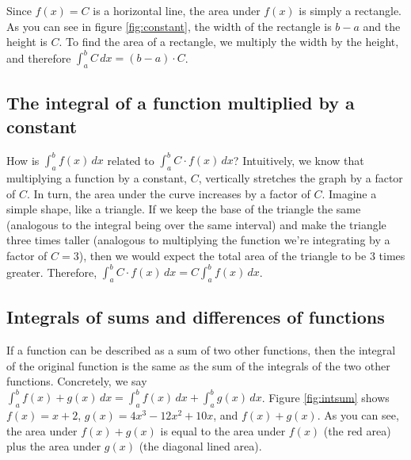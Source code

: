 Since $f(x) = C$ is a horizontal line, the area under $f(x)$ is simply 
a rectangle. As you can see in figure \ref{fig:constant}, the width of 
the rectangle is $b - a$ and the height is $C$. To find the area of a 
rectangle, we multiply the width by the height, and therefore $\int_a^b 
C\,dx = (b - a)\cdot C$.

\subsection{The integral of a function multiplied by a constant}
How is $\int_a^b f(x)\,dx$ related to $\int_a^b C \cdot f(x)\,dx$? 
Intuitively, we know that multiplying a function by a constant, $C$, 
vertically stretches the graph by a factor of $C$. In turn, the area 
under the curve increases by a factor of $C$. Imagine a simple shape, 
like a triangle. If we keep the base of the triangle the same 
(analogous to the integral being over the same interval) and make the 
triangle three times taller (analogous to multiplying the function 
we're integrating by a factor of $C = 3$), then we would expect the 
total area of the triangle to be 3 times greater. Therefore, 
$\int_a^b C \cdot f(x)\,dx = C \int_a^b f(x)\,dx$. 

\subsection{Integrals of sums and differences of functions}
If a function can be described as a sum of two other functions, then 
the integral of the original function is the same as the sum of the 
integrals of the two other functions. Concretely, we say $\int_a^b 
f(x) + g(x)\,dx = \int_a^b f(x)\,dx + \int_a^b g(x)\,dx$. Figure 
\ref{fig:intsum} shows $f(x) = x + 2$, $g(x) = 4x^3-12x^2+10x$, and 
$f(x) + g(x)$. As you can see, the area under $f(x) + g(x)$ is equal 
to the area under $f(x)$ (the red area) plus the area under $g(x)$ 
(the diagonal lined area). 

